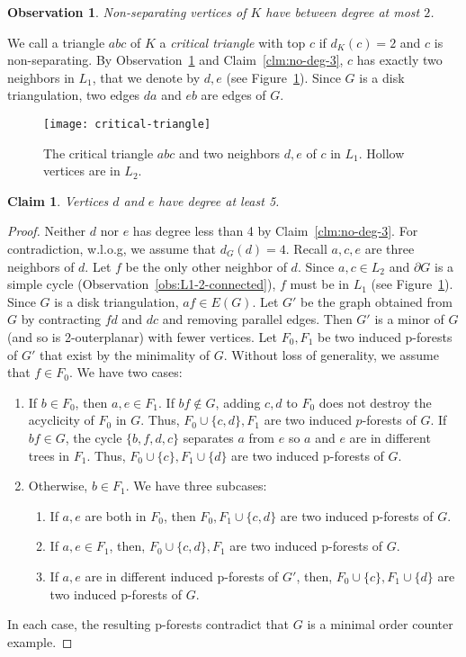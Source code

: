 \documentclass[11pt]{article}
\newtheorem{claim}[theorem]{Claim}
\newtheorem{observation}[theorem]{Observation}
\begin{document}
\begin{observation} \label{obs:K-non-cut-deg}
Non-separating vertices of $K$ have between degree at most $2$. 
\end{observation}


We call a triangle $abc$ of $K$ a \emph{critical triangle} with top $c$ if $d_K(c) = 2$ and $c$ is non-separating. By Observation~\ref{obs:K-non-cut-deg} and Claim~\ref{clm:no-deg-3}, $c$ has exactly two neighbors in $L_1$, that we denote by $d,e$ (see Figure~\ref{fig:critical-triangle}). Since $G$ is a disk triangulation, two edges $da$ and $eb$ are edges of $G$. 
\begin{figure}[tbh]
  \centering
    \texttt{[image: critical-triangle]}
      \caption{The critical triangle $abc$ and two neighbors $d,e$ of $c$ in $L_1$. Hollow vertices are in $L_2$. }
       \label{fig:critical-triangle}
\end{figure}

\begin{claim} \label{clm:at-least-deg-5}
Vertices $d$ and $e$ have degree at least 5.
\end{claim}
\begin{proof}
Neither $d$ nor $e$ has degree less than 4 by Claim~\ref{clm:no-deg-3}. For contradiction, w.l.o.g, we assume that $d_G(d) = 4$.  Recall $a,c, e$ are three neighbors of $d$. Let $f$ be the only other neighbor of $d$. Since $a,c \in L_2$ and $\partial G$ is a simple cycle (Observation~\ref{obs:L1-2-connected}), $f$ must be in $L_1$ (see Figure~\ref{fig:critical-triangle}). Since $G$ is a disk triangulation, $af \in E(G)$. Let $G'$ be the graph obtained from $G$ by contracting $fd$ and $dc$ and removing parallel edges. Then $G'$ is a minor of $G$ (and so is 2-outerplanar) with fewer vertices. Let $F_0,F_1$ be two induced p-forests of $G'$ that exist by the minimality of $G$. Without loss of generality, we assume that $f \in F_0$. We have two cases:
\begin{enumerate}
\item If $b \in F_0$, then $a,e \in F_1$. If $bf \not\in G$, adding $c,d$ to $F_0$ does not destroy the acyclicity of $F_0$ in $G$. Thus, $F_0 \cup \{c,d\}, F_1$ are two induced $p$-forests of $G$. If $bf \in G$, the cycle $\{b,f,d,c\}$ separates $a$ from $e$ so $a$ and $e$ are in different trees in $F_1$. Thus, $F_0 \cup \{c\}, F_1 \cup \{d\}$ are two induced p-forests of $G$.   
\item Otherwise, $b \in F_1$. We have three subcases:
	\begin{enumerate}
		\item If $a,e$ are both in $F_0$, then $F_0,F_1 \cup  \{c,d\}$ are two induced p-forests of $G$.
		\item If $a,e \in F_1$, then, $F_0 \cup \{c,d\}, F_1$ are two induced p-forests of $G$.
		\item  If $a,e$ are in different induced p-forests of $G'$, then,  $F_0 \cup \{c\}, F_1 \cup \{d\}$ are two induced p-forests of $G$.
	\end{enumerate}	 
\end{enumerate}
In each case, the resulting p-forests contradict that $G$ is a minimal order counter example. 
\end{proof}
\end{document}
